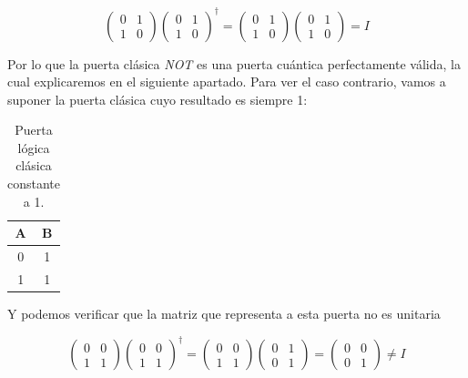 \documentclass[12pt]{article}
\numberwithin{equation}{section} %
\begin{document}
    \begin{equation*}
        \begin{pmatrix}
            0 & 1 \\
            1 & 0
        \end{pmatrix} \begin{pmatrix}
            0 & 1 \\
            1 & 0
        \end{pmatrix} ^ {\dagger} = \begin{pmatrix}
            0 & 1 \\
            1 & 0
        \end{pmatrix} \begin{pmatrix}
            0 & 1 \\
            1 & 0
        \end{pmatrix} = I
    \end{equation*}

    \vspace{2.5mm}

    Por lo que la puerta clásica \textit{NOT} es una puerta cuántica perfectamente válida, la cual explicaremos en el siguiente apartado. Para ver el caso contrario, vamos a suponer la puerta clásica cuyo resultado es siempre 1:
    
    \begin{table}[h!]
        \centering
        \begin{tabular}{|c|c|}
            \hline
            A & B \\
            \hline
            0 & 1 \\
            1 & 1 \\
            \hline
        \end{tabular}
        \caption{Puerta lógica clásica constante a 1.}
        \label{table: puerta_clasica_todo_1}
    \end{table}

    Y  podemos verificar que la matriz que representa a esta puerta no es unitaria
        
    \begin{equation*}
        \begin{pmatrix}
            0 & 0 \\
            1 & 1
        \end{pmatrix} \begin{pmatrix}
            0 & 0 \\
            1 & 1
        \end{pmatrix} ^ {\dagger} = \begin{pmatrix}
            0 & 0 \\
            1 & 1
        \end{pmatrix} \begin{pmatrix}
            0 & 1 \\
            0 & 1
        \end{pmatrix} =  \begin{pmatrix}
            0 & 0 \\
            0 & 1
        \end{pmatrix} \neq I
    \end{equation*}
\end{document}
